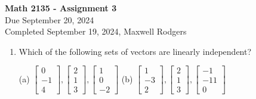 \documentclass[12pt]{amsart}
\newcommand{\vd}[3]{\left[\begin{matrix} #1 \\ #2 \\ #3 \end{matrix}\right]}
\begin{document}
\begin{center}
{\Large\textbf{Math 2135 - Assignment 3}}\\
\medskip
Due September 20, 2024 \\
Completed September 19, 2024, Maxwell Rodgers
\end{center}
\medskip
\thispagestyle{empty}

\begin{enumerate}

\item
  Which of the following sets of vectors are linearly independent?
  
  (a) $\vd{0}{-1}{4},\vd{2}{1}{3},\vd{1}{0}{-2}$   \hspace{2cm}
  (b) $\vd{1}{-3}{2},\vd{2}{1}{3},\vd{-1}{-11}{0}$



\end{enumerate}
\end{document}
